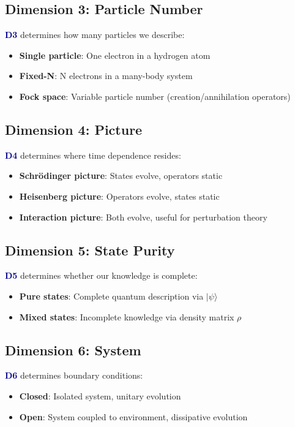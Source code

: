 \documentclass[12pt,openany,oneside]{book}
\newcommand{\dimensionindex}[1]{\textcolor{darkblue}{\textbf{D#1}}}
\newcommand{\ket}[1]{|#1\rangle}
\begin{document}
\subsection{Dimension 3: Particle Number}
\dimensionindex{3} determines how many particles we describe:
\begin{itemize}
  \item \textbf{Single particle}: One electron in a hydrogen atom
  \item \textbf{Fixed-N}: N electrons in a many-body system
  \item \textbf{Fock space}: Variable particle number (creation/annihilation operators)
\end{itemize}

\subsection{Dimension 4: Picture}
\dimensionindex{4} determines where time dependence resides:
\begin{itemize}
  \item \textbf{Schrödinger picture}: States evolve, operators static
  \item \textbf{Heisenberg picture}: Operators evolve, states static
  \item \textbf{Interaction picture}: Both evolve, useful for perturbation theory
\end{itemize}

\subsection{Dimension 5: State Purity}
\dimensionindex{5} determines whether our knowledge is complete:
\begin{itemize}
  \item \textbf{Pure states}: Complete quantum description via $\ket{\psi}$
  \item \textbf{Mixed states}: Incomplete knowledge via density matrix $\rho$
\end{itemize}

\subsection{Dimension 6: System}
\dimensionindex{6} determines boundary conditions:
\begin{itemize}
  \item \textbf{Closed}: Isolated system, unitary evolution
  \item \textbf{Open}: System coupled to environment, dissipative evolution
\end{itemize}
\end{document}
